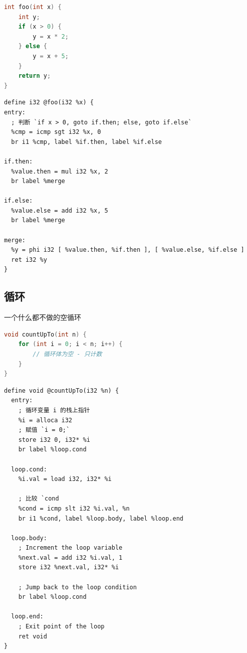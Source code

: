 \begin{lstlisting}[language=cpp]
int foo(int x) {
    int y;
    if (x > 0) {
        y = x * 2;
    } else {
        y = x + 5;
    }
    return y;
}
\end{lstlisting}

\begin{lstlisting}[language=none]
define i32 @foo(i32 %x) {
entry:
  ; 判断 `if x > 0, goto if.then; else, goto if.else`
  %cmp = icmp sgt i32 %x, 0
  br i1 %cmp, label %if.then, label %if.else

if.then:
  %value.then = mul i32 %x, 2
  br label %merge

if.else:
  %value.else = add i32 %x, 5
  br label %merge

merge:
  %y = phi i32 [ %value.then, %if.then ], [ %value.else, %if.else ]
  ret i32 %y
}
\end{lstlisting}


\subsection{循环}
一个什么都不做的空循环
\begin{lstlisting}[language=cpp]
void countUpTo(int n) {
    for (int i = 0; i < n; i++) {
        // 循环体为空 - 只计数
    }
}
\end{lstlisting}

\begin{lstlisting}[language=none]
define void @countUpTo(i32 %n) {
  entry:
    ; 循环变量 i 的栈上指针
    %i = alloca i32
    ; 赋值 `i = 0;`
    store i32 0, i32* %i
    br label %loop.cond

  loop.cond:
    %i.val = load i32, i32* %i

    ; 比较 `cond
    %cond = icmp slt i32 %i.val, %n
    br i1 %cond, label %loop.body, label %loop.end

  loop.body:
    ; Increment the loop variable
    %next.val = add i32 %i.val, 1
    store i32 %next.val, i32* %i

    ; Jump back to the loop condition
    br label %loop.cond

  loop.end:
    ; Exit point of the loop
    ret void
}
\end{lstlisting}

